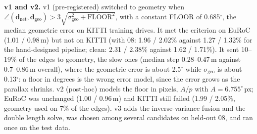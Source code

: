 \documentclass[letterpaper,journal]{IEEEtran}
\newcommand{\dnet}{\mathbf{d}_{\mathrm{net}}}
\newcommand{\dgeo}{\mathbf{d}_{\mathrm{geo}}}
\begin{document}
\begin{table}[t]
\caption{The four gate versions. KITTI: $t_\mathrm{rel}$\,\% on the with-08 split, OXTS; EuRoC: 4-sequence ATE (m, two models); TUM-VI: ATE (m, mean of three seeds). Hand-designed pipeline: 1.27, 1.02, 0.47.}
\label{tab:versions}
\centering\small
\setlength{\tabcolsep}{3pt}
\end{table}

\textbf{v1 and v2.} v1 (pre-registered) switched to geometry when $\angle(\dnet,\dgeo)>3\sqrt{\sigma_{\mathrm{geo}}^2+\mathrm{FLOOR}^2}$, with a constant FLOOR of 0.685$^\circ$, the median geometric error on KITTI training drives. It met the criterion on EuRoC (1.01 / 0.98\,m) but not on KITTI (with 08: 1.96 / 2.02\% against 1.27 / 1.32\% for the hand-designed pipeline; clean: 2.31 / 2.38\% against 1.62 / 1.71\%). It sent 10--19\% of the edges to geometry, the slow ones (median step 0.28--0.47\,m against 0.7--0.86\,m overall), where the geometric error is about 2.5$^\circ$ while $\sigma_{\mathrm{geo}}$ is about 0.13$^\circ$: a floor in degrees is the wrong error model, since the error grows as the parallax shrinks. v2 (post-hoc) models the floor in pixels, $A/p$ with $A=6.755^\circ$\,px; EuRoC was unchanged (1.00 / 0.96\,m) and KITTI still failed (1.99 / 2.05\%, geometry used on 7\% of the edges). v3 adds the inverse-variance fusion and the double length solve, was chosen among several candidates on held-out 08, and ran once on the test data.

\begin{table}[t]
\caption{Sensitivity to the KITTI condition-number bound ($W=500$). Training: share of edges that use the IMU length and the median relative error of those lengths. Test: $t_\mathrm{rel}$\,\%, mean of three seeds (with 08; no 08 with mirror augmentation).}
\label{tab:sens}
\centering\small
\setlength{\tabcolsep}{3pt}
\end{table}
\end{document}
